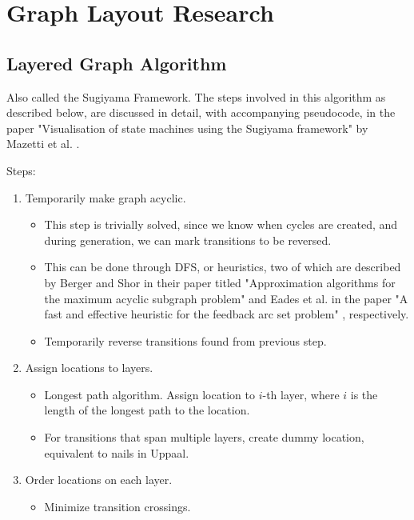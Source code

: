 \section{Graph Layout Research}


\subsection{Layered Graph Algorithm}
Also called the Sugiyama Framework. The steps involved in this algorithm as described below, are discussed in detail, with accompanying pseudocode, in the paper "Visualisation of state machines using the Sugiyama framework" by Mazetti et al. \cite{Mazetti2012}.
\noindent

Steps:
\begin{enumerate}
    \item Temporarily make graph acyclic.
          \begin{itemize}
              \item This step is trivially solved, since we know when cycles are created, and during generation, we can mark transitions to be reversed.
              \item This can be done through DFS, or heuristics, two of which are described by Berger and Shor in their paper titled "Approximation algorithms for the maximum acyclic subgraph problem" \cite{Berger1990} and Eades et al. in the paper "A fast and effective heuristic for the feedback arc set problem" \cite{Eades1993}, respectively.
              \item Temporarily reverse transitions found from previous step.
          \end{itemize}
    \item Assign locations to layers.
          \begin{itemize}
              \item Longest path algorithm. Assign location to $i$-th layer, where $i$ is the length of the longest path to the location.
              \item For transitions that span multiple layers, create dummy location, equivalent to nails in Uppaal.
          \end{itemize}
    \item Order locations on each layer.
          \begin{itemize}
              \item Minimize transition crossings.

\end{itemize}
\end{enumerate}
